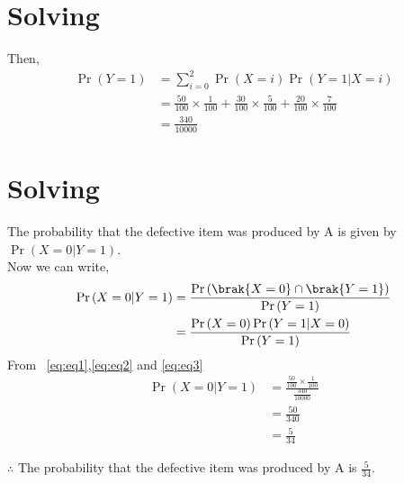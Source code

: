 \documentclass{beamer}
\providecommand{\pr}[1]{\ensuremath{\Pr\left(#1\right)}}
\begin{document}
\section{Solving}
\begin{frame}{}
    Then,
\begin{align}
\pr{Y=1}&=\sum_{i=0}^{2}\pr{X=i}\pr{Y=1|X=i}\\
&=\frac{50}{100}\times\frac{1}{100}+\frac{30}{100}\times\frac{5}{100}+\frac{20}{100}\times\frac{7}{100}\\
&=\frac{340}{10000}\label{eq:eq3}
\end{align}
\end{frame}
\section{Solving}
\begin{frame}{}
The probability that the defective item was produced by A is given by $\pr{X=0|Y=1}$.\\
Now we can write,
\begin{align}
\pr{X=0|Y=1}&=\frac{\pr{\brak{X=0}\cap\brak{Y=1}}}{\pr{Y=1}}\\
&=\frac{\pr{X=0}\pr{Y=1|X=0}}{\pr{Y=1}}
\end{align}
From ~\eqref{eq:eq1},\eqref{eq:eq2} and \eqref{eq:eq3} 
\begin{align}
\pr{X=0|Y=1}&=\frac{\frac{50}{100}\times\frac{1}{100}}{\frac{340}{10000}}\\
&=\frac{50}{340}\\
&=\frac{5}{34}
\end{align}

\begin{block}{}
$\therefore$ The probability that the defective item was produced by A is $\frac{5}{34}$.
\end{block}

\end{frame}
\end{document}
